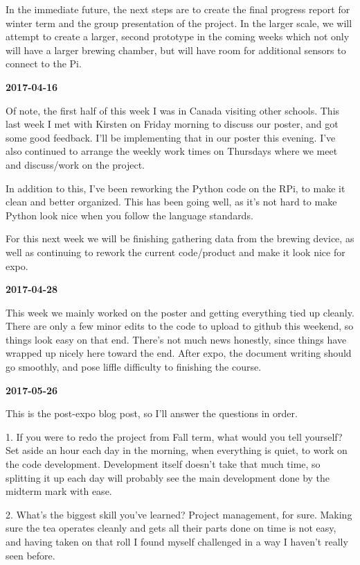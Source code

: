 In the immediate future, the next steps are to create the final progress report for winter term and the group presentation of the project.
In the larger scale, we will attempt to create a larger, second prototype in the coming weeks which not only will have a larger brewing chamber, but will have room for additional sensors to connect to the Pi.

\textbf{2017-04-16} 

Of note, the first half of this week I was in Canada visiting other schools.
This last week I met with Kirsten on Friday morning to discuss our poster, and got some good feedback. I'll be implementing that in our poster this evening.
I've also continued to arrange the weekly work times on Thursdays where we meet and discuss/work on the project.

In addition to this, I've been reworking the Python code on the RPi, to make it clean and better organized. This has been going well, as it's not hard to make Python look nice when you follow the language standards.

For this next week we will be finishing gathering data from the brewing device, as well as continuing to rework the current code/product and make it look nice for expo.

\textbf{2017-04-28} 

This week we mainly worked on the poster and getting everything tied up cleanly. There are only a few minor edits to the code to upload to github this weekend, so things look easy on that end. There's not much news honestly, since things have wrapped up nicely here toward the end. After expo, the document writing should go smoothly, and pose liffle difficulty to finishing the course.

\textbf{2017-05-26} 

This is the post-expo blog post, so I'll answer the questions in order.

1. If you were to redo the project from Fall term, what would you tell yourself?
Set aside an hour each day in the morning, when everything is quiet, to work on the code development. Development itself doesn't take that much time, so splitting it up each day will probably see the main development done by the midterm mark with ease. 

2. What's the biggest skill you've learned?
Project management, for sure. Making sure the tea operates cleanly and gets all their parts done on time is not easy, and having taken on that roll I found myself challenged in a way I haven't really seen before.


